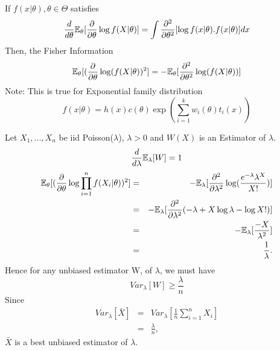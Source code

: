 \documentclass[a4paper,english,12pt]{article}
\begin{document}
\begin{lem}
If $f(x|\theta), \theta \in \Theta$ satisfies
\begin{equation}
\frac{d}{d\theta} \mathbb{E}_\theta[\frac{\partial}{\partial\theta} \log f(X|\theta)] = \int \frac{\partial^2}{\partial\theta^2}[\log f(x|\theta).f(x|\theta)] dx
\end{equation}
Then, the Fisher Information
\begin{equation}
\mathbb{E}_\theta[(\frac{\partial}{\partial\theta} \log(f(X|\theta))^2] = -\mathbb{E}_\theta[\frac{\partial^2}{\partial\theta^2}\log(f(X|\theta))]
\end{equation}
Note: This is true for Exponential family distribution
\begin{equation*}
f(x|\theta)=h(x)c(\theta)\exp\left(\sum_{i=1}^{k}w_i(\theta)t_i(x)\right)
\end{equation*}
\end{lem}



\begin{exmp}
Let $X_1,...,X_n$ be iid Poisson($\lambda$), $\lambda>0$ and $W(X)$ is an Estimator of $\lambda$.
\begin{equation*}
\frac{d}{d\lambda}\mathbb{E}_\lambda[W] = 1
\end{equation*}
\begin{eqnarray*}
\mathbb{E}_\theta[(\frac{\partial}{\partial\theta} \log \prod_{i=1}^{n} f(X_i|\theta))^2] &=& 
-\mathbb{E}_\lambda[\frac{\partial^2}{\partial\lambda^2}\log(\frac{e^{-\lambda}\lambda^X}{X!})] \\ &=& -\mathbb{E}_\lambda[\frac{\partial^2}{\partial\lambda^2}(-\lambda+X\log\lambda-\log X!)] \\
&=&-\mathbb{E}_\lambda[\frac{-X}{\lambda^2}] \\
&=&\frac{1}{\lambda}.
\end{eqnarray*}
Hence for any unbiased estimator W, of $\lambda$, we must have
\begin{equation}
Var_\lambda[W] \geq \frac{\lambda}{n}
\end{equation}
Since
\begin{eqnarray*}
Var_\lambda[\bar{X}] &=& Var_\lambda[\frac{1}{n}\sum_{i=1}^{n}X_i] \\
&=& \frac{\lambda}{n},
\end{eqnarray*}
$\bar{X}$ is a best unbiased estimator of $\lambda$.
\end{exmp}
\end{document}
